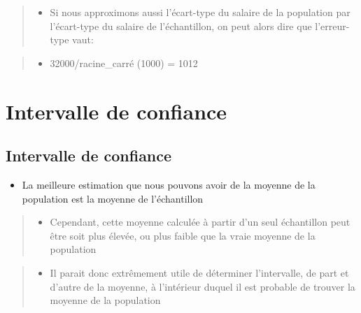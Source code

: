 \documentclass[
]{article}
\providecommand{\tightlist}{%
  \setlength{\itemsep}{0pt}\setlength{\parskip}{0pt}}
\begin{document}
\begin{quote}
\begin{itemize}
\tightlist
\item
  Si nous approximons aussi l'écart-type du salaire de la population par
  l'écart-type du salaire de l'échantillon, on peut alors dire que
  l'erreur-type vaut:
\end{itemize}
\end{quote}

\begin{quote}
\begin{itemize}
\tightlist
\item
  32000/racine\_carré (1000) = 1012
\end{itemize}
\end{quote}

\hypertarget{intervalle-de-confiance}{%
\section{Intervalle de confiance}\label{intervalle-de-confiance}}

\hypertarget{intervalle-de-confiance-1}{%
\subsection{Intervalle de confiance}\label{intervalle-de-confiance-1}}

\begin{itemize}
\tightlist
\item
  La meilleure estimation que nous pouvons avoir de la moyenne de la
  population est la moyenne de l'échantillon
\end{itemize}

\begin{quote}
\begin{itemize}
\tightlist
\item
  Cependant, cette moyenne calculée à partir d'un seul échantillon peut
  être soit plus élevée, ou plus faible que la vraie moyenne de la
  population
\end{itemize}
\end{quote}

\begin{quote}
\begin{itemize}
\tightlist
\item
  Il parait donc extrêmement utile de déterminer l'intervalle, de part
  et d'autre de la moyenne, à l'intérieur duquel il est probable de
  trouver la moyenne de la population
\end{itemize}
\end{quote}
\end{document}
